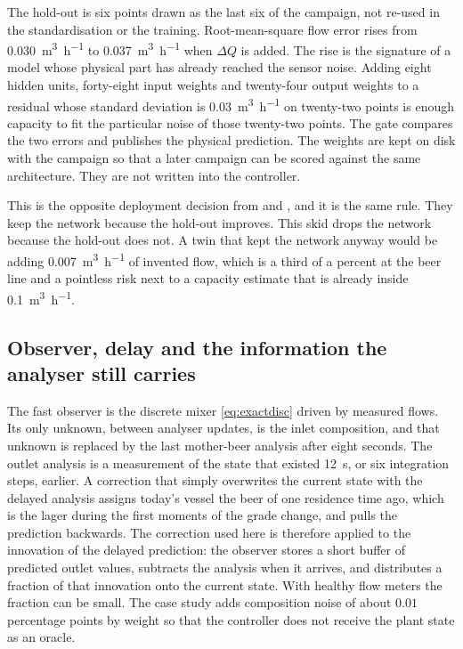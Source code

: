 The hold-out is six points drawn as the last six of the campaign, not re-used in the standardisation or the training. Root-mean-square flow error rises from \SI{0.030}{\cubic\metre\per\hour} to \SI{0.037}{\cubic\metre\per\hour} when $\Delta Q$ is added. The rise is the signature of a model whose physical part has already reached the sensor noise. Adding eight hidden units, forty-eight input weights and twenty-four output weights to a residual whose standard deviation is \SI{0.03}{\cubic\metre\per\hour} on twenty-two points is enough capacity to fit the particular noise of those twenty-two points. The gate compares the two errors and publishes the physical prediction. The weights are kept on disk with the campaign so that a later campaign can be scored against the same architecture. They are not written into the controller.

This is the opposite deployment decision from \citet{wu2023cerd} and \citet{zheng2023}, and it is the same rule. They keep the network because the hold-out improves. This skid drops the network because the hold-out does not. A twin that kept the network anyway would be adding \SI{0.007}{\cubic\metre\per\hour} of invented flow, which is a third of a percent at the beer line and a pointless risk next to a capacity estimate that is already inside \SI{0.1}{\cubic\metre\per\hour}.

\subsection{Observer, delay and the information the analyser still carries}
\label{sec:observer}

The fast observer is the discrete mixer \eqref{eq:exactdisc} driven by measured flows. Its only unknown, between analyser updates, is the inlet composition, and that unknown is replaced by the last mother-beer analysis after eight seconds. The outlet analysis is a measurement of the state that existed \SI{12}{\second}, or six integration steps, earlier. A correction that simply overwrites the current state with the delayed analysis assigns today's vessel the beer of one residence time ago, which is the lager during the first moments of the grade change, and pulls the prediction backwards. The correction used here is therefore applied to the innovation of the delayed prediction: the observer stores a short buffer of predicted outlet values, subtracts the analysis when it arrives, and distributes a fraction of that innovation onto the current state. With healthy flow meters the fraction can be small. The case study adds composition noise of about $0.01$ percentage points by weight so that the controller does not receive the plant state as an oracle.

